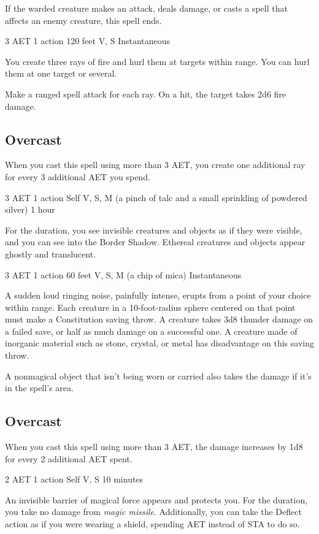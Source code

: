 If the warded creature makes an attack, deals damage, or casts a spell that affects an enemy creature, this spell ends.

\label{spell:scorching-ray}
{3 AET}
{1 action}
{120 feet}
{V, S}
{Instantaneous}

You create three rays of fire and hurl them at targets within range. You can hurl them at one target or several.

Make a ranged spell attack for each ray. On a hit, the target takes 2d6 fire damage.

\subsection*{Overcast} When you cast this spell using more than 3 AET, you create one additional ray for every 3 additional AET you spend.

\label{spell:see-invisibility}
{3 AET}
{1 action}
{Self}
{V, S, M (a pinch of talc and a small sprinkling of powdered silver)}
{1 hour}

For the duration, you see invisible creatures and objects as if they were visible, and you can see into the Border Shadow. Ethereal creatures and objects appear ghostly and translucent.

\label{spell:shatter}
{3 AET}
{1 action}
{60 feet}
{V, S, M (a chip of mica)}
{Instantaneous}

A sudden loud ringing noise, painfully intense, erupts from a point of your choice within range. Each creature in a 10-foot-radius sphere centered on that point must make a Constitution saving throw. A creature takes 3d8 thunder damage on a failed save, or half as much damage on a successful one. A creature made of inorganic material such as stone, crystal, or metal has disadvantage on this saving throw.

A nonmagical object that isn't being worn or carried also takes the damage if it's in the spell's area.

\subsection*{Overcast} When you cast this spell using more than 3 AET, the damage increases by 1d8 for every 2 additional AET spent.

\label{spell:shield}
{2 AET}
{1 action}
{Self}
{V, S}
{10 minutes}

An invisible barrier of magical force appears and protects you. For the duration, you take no damage from \textit{magic missile}. Additionally, you can take the Deflect action as if you were wearing a shield, spending AET instead of STA to do so.


